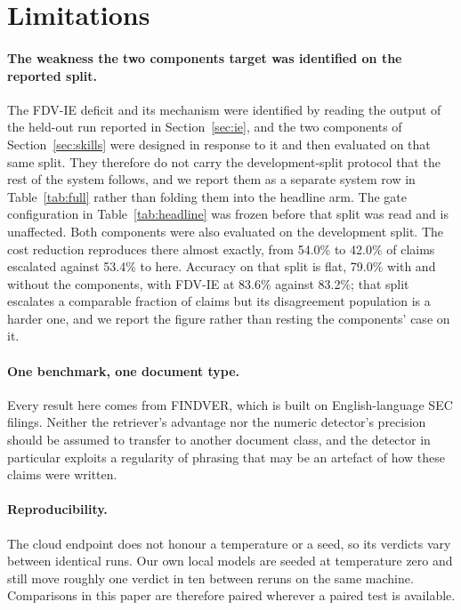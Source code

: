 \documentclass{article}
\begin{document}
\section{Limitations}
\label{sec:limitations}

\paragraph{The weakness the two components target was identified on the reported split.}
The FDV-IE deficit and its mechanism were identified by reading the output of the held-out
run reported in Section~\ref{sec:ie}, and the two components of Section~\ref{sec:skills}
were designed in response to it and then evaluated on that same split. They therefore do not
carry the development-split protocol that the rest of the system follows, and we report them
as a separate system row in Table~\ref{tab:full} rather than folding them into the headline
arm. The gate configuration in Table~\ref{tab:headline} was frozen before that split was
read and is unaffected. Both components were also evaluated on the development split. The
cost reduction reproduces there almost exactly, from 54.0\% to 42.0\% of claims escalated
against 53.4\% to \fullEscRate{} here. Accuracy on that split is flat, 79.0\% with and
without the components, with FDV-IE at 83.6\% against 83.2\%; that split escalates a
comparable fraction of claims but its disagreement population is a harder one, and we report
the figure rather than resting the components' case on it.

\paragraph{One benchmark, one document type.}
Every result here comes from FINDVER, which is built on English-language SEC filings.
Neither the retriever's advantage nor the numeric detector's precision should be assumed
to transfer to another document class, and the detector in particular exploits a
regularity of phrasing that may be an artefact of how these claims were written.

\paragraph{Reproducibility.}
The cloud endpoint does not honour a temperature or a seed, so its verdicts vary between
identical runs. Our own local models are seeded at temperature zero and still move roughly
one verdict in ten between reruns on the same machine. Comparisons in this paper are
therefore paired wherever a paired test is available.
\end{document}
